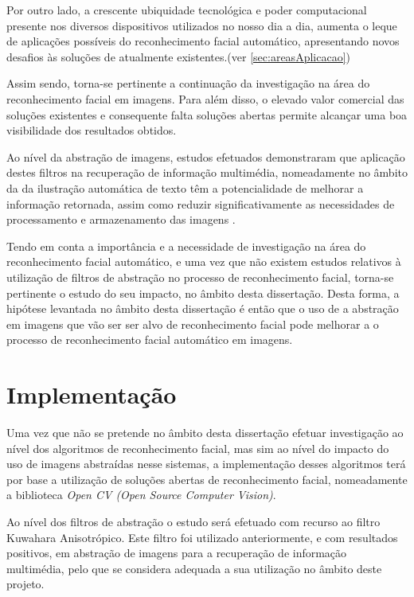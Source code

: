 Por outro lado, a crescente ubiquidade tecnológica e poder computacional presente nos diversos dispositivos utilizados no nosso dia a dia, aumenta o leque de aplicações possíveis do reconhecimento facial automático, apresentando novos desafios às soluções de atualmente existentes.(ver \ref{sec:areasAplicacao})

Assim sendo, torna-se pertinente a continuação da investigação na área do reconhecimento facial em imagens. Para além disso, o elevado valor comercial das soluções existentes e consequente falta soluções abertas permite alcançar uma boa visibilidade dos resultados obtidos.

Ao nível da abstração de imagens, estudos efetuados demonstraram que aplicação destes filtros na recuperação de informação multimédia, nomeadamente no âmbito da da ilustração automática de texto têm a potencialidade de melhorar a informação retornada, assim como reduzir significativamente as necessidades de processamento e armazenamento das imagens \citep{Coelho:2012:IAC:2260641.2260676}. 

Tendo em conta a importância e a necessidade de investigação na área do reconhecimento facial automático, e uma vez que não existem estudos relativos à utilização de filtros de abstração no processo de reconhecimento facial, torna-se pertinente o estudo do seu impacto, no âmbito desta dissertação. Desta forma, a hipótese levantada no âmbito desta dissertação é então que o uso de a abstração em imagens que vão ser ser alvo de reconhecimento facial pode melhorar a o processo de reconhecimento facial automático em imagens.

\section{Implementação} \label{sec:implementacao}
Uma vez que não se pretende no âmbito desta dissertação efetuar investigação ao nível dos algoritmos de reconhecimento facial, mas sim ao nível do impacto do uso de imagens abstraídas nesse sistemas, a implementação desses algoritmos terá por base a utilização de soluções abertas de reconhecimento facial, nomeadamente a biblioteca \textit{Open CV (Open Source Computer Vision)}.

Ao nível dos filtros de abstração o estudo será efetuado com recurso ao filtro Kuwahara Anisotrópico.
Este filtro foi utilizado anteriormente, e com resultados positivos, em abstração de imagens para a recuperação de informação multimédia, pelo que se considera adequada a sua utilização no âmbito deste projeto.
	
